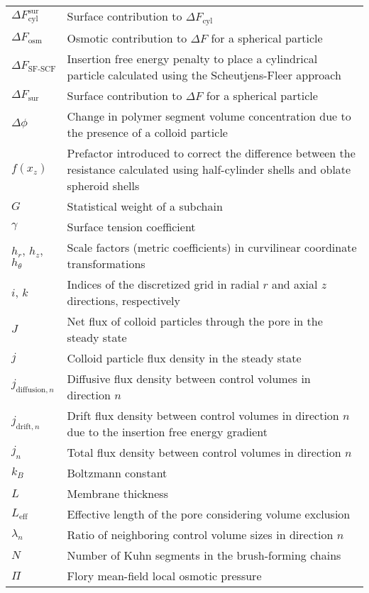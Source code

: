 \documentclass[10pt, a4paper]{article}
\begin{document}
\begin{tabularx}{\linewidth}{l X}
    $\Delta F_{\textrm{cyl}}^{\textrm{sur}}$ & Surface contribution to $\Delta F_{\textrm{cyl}}$ \\
    $\Delta F_{\textrm{osm}}$ & Osmotic contribution to $\Delta F$ for a spherical particle\\
    $\Delta F_{\textrm{SF-SCF}}$ & Insertion free energy penalty to place a cylindrical particle calculated using the Scheutjens-Fleer approach \\
    $\Delta F_{\textrm{sur}}$ & Surface contribution to $\Delta F$ for a spherical particle\\
    $\Delta \phi$ & Change in polymer segment volume concentration due to the presence of a colloid particle \\
    $f(x_z)$ & Prefactor introduced to correct the difference between the resistance calculated using half-cylinder shells and oblate spheroid shells \\
    $G$ & Statistical weight of a subchain \\
    $\gamma$ & Surface tension coefficient \\
    $h_{r}$, $h_{z}$, $h_{\theta}$ & Scale factors (metric coefficients) in curvilinear coordinate transformations \\
    $i$, $k$ & Indices of the discretized grid in radial $r$ and axial $z$ directions, respectively \\
    $J$ & Net flux of colloid particles through the pore in the steady state \\
    $j$ & Colloid particle flux density in the steady state \\
    $j_{\textrm{diffusion}, n}$ & Diffusive flux density between control volumes in direction $n$ \\
    $j_{\textrm{drift}, n}$ & Drift flux density between control volumes in direction $n$ due to the insertion free energy gradient \\
    $j_{n}$ & Total flux density between control volumes in direction $n$ \\
    $k_B$ & Boltzmann constant \\
    $L$ & Membrane thickness \\
    $L_{\textrm{eff}}$ & Effective length of the pore considering volume exclusion \\
    $\lambda_{n}$ & Ratio of neighboring control volume sizes in direction $n$ \\
    $N$ & Number of Kuhn segments in the brush-forming chains \\
    $\Pi$ & Flory mean-field local osmotic pressure \\

\end{tabularx}
\end{document}
